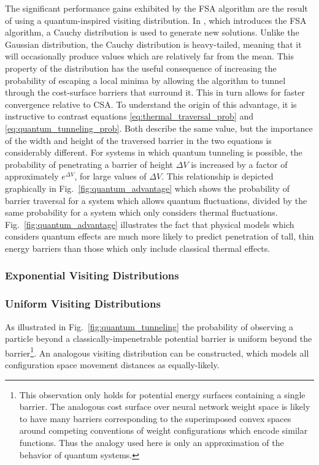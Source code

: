 \documentclass[11pt]{afthesis}
\begin{document}
	 The significant performance gains exhibited by the FSA algorithm are the result of using a quantum-inspired visiting distribution. In \cite{szu1987fastsimulatedannealing}, which introduces the FSA algorithm, a Cauchy distribution is used to generate new solutions. Unlike the Gaussian distribution, the Cauchy distribution is heavy-tailed, meaning that it will occasionally produce values which are relatively far from the mean. This property of the distribution has the useful consequence of increasing the probability of escaping a local minima by allowing the algorithm to tunnel through the cost-surface barriers that surround it. This in turn allows for faster convergence relative to CSA. To understand the origin of this advantage, it is instructive to contrast equations \ref{eq:thermal_traversal_prob} and \ref{eq:quantum_tunneling_prob}. Both describe the same value, but the importance of the width and height of the traversed barrier in the two equations is considerably different. For systems in which quantum tunneling is possible, the probability of penetrating a barrier of height \begin{math} \Delta V \end{math} is increased by a factor of approximately \begin{math} e^{\Delta V} \end{math}, for large values of \begin{math} \Delta V \end{math}. This relationship is depicted graphically in Fig.~\ref{fig:quantum_advantage} which shows the probability of barrier traversal for a system which allows quantum fluctuations, divided by the same probability for a system which only considers thermal fluctuations. Fig.~\ref{fig:quantum_advantage} illustrates the fact that physical models which considers quantum effects are much more likely to predict penetration of tall, thin energy barriers than those which only include classical thermal effects. 

	
	\subsubsection{Exponential Visiting Distributions}
	
	
	
	\subsubsection{Uniform Visiting Distributions}
	
	As illustrated in Fig.~\ref{fig:quantum_tunneling} the probability of observing a particle beyond a classically-impenetrable potential barrier is uniform beyond the barrier\footnote{This observation only holds for potential energy surfaces containing a single barrier. The analogous cost surface over neural network weight space is likely to have many barriers corresponding to the superimposed convex spaces around competing conventions of weight configurations which encode similar functions. Thus the analogy used here is only an approximation of the behavior of quantum systems.}. An analogous visiting distribution can be constructed, which models all configuration space movement distances as equally-likely. 
\end{document}
